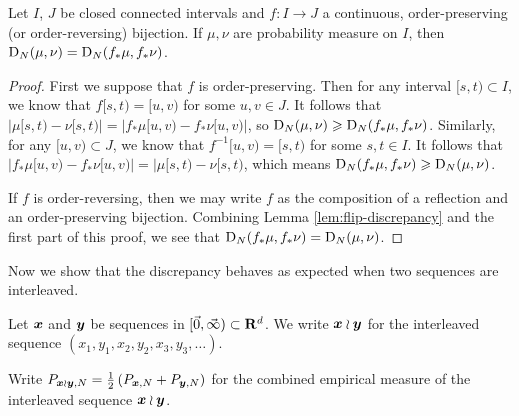 \begin{lemma}\label{lem:push-discrepancy}
Let $I$, $J$ be closed connected intervals and $f\colon I\to J$ a continuous, 
order-preserving (or order-reversing) bijection. If $\mu,\nu$ are probability 
measure on $I$, then 
$\operatorname{D}_N(\mu,\nu) = \operatorname{D}_N(f_\ast \mu,f_\ast\nu)$.
\end{lemma}
\begin{proof}
First we suppose that $f$ is order-preserving. Then for any interval 
$[s,t)\subset I$, we know that $f[s,t) = [u,v)$ for some $u,v\in J$. It follows 
that $|\mu[s,t) - \nu[s,t)| = |f_\ast\mu[u,v) - f_\ast\nu[u,v)|$, so 
$\operatorname{D}_N(\mu,\nu) \geqslant \operatorname{D}_N(f_\ast\mu,f_\ast\nu)$. Similarly, for any 
$[u,v)\subset J$, we know that $f^{-1}[u,v) = [s,t)$ for some 
$s,t\in I$. It follows that 
$|f_\ast\mu[u,v) - f_\ast\nu[u,v)| = |\mu[s,t) - \nu[s,t)$, which means 
$\operatorname{D}_N(f_\ast\mu,f_\ast\nu) \geqslant \operatorname{D}_N(\mu,\nu)$.

If $f$ is order-reversing, then we may write $f$ as the composition of a 
reflection and an order-preserving bijection. Combining Lemma 
\ref{lem:flip-discrepancy} and the first part of this proof, we see that 
$\operatorname{D}_N(f_\ast\mu,f_\ast\nu) = \operatorname{D}_N(\mu,\nu)$. 
\end{proof}

Now we show that the discrepancy behaves as expected when two sequences are 
interleaved. 

\begin{definition}
Let ${\boldsymbol x}$ and ${\boldsymbol y}$ be sequences in $[\vec{0},\vec{\infty})\subset \mathbf{R}^d$. We write 
${\boldsymbol x}\wr{\boldsymbol y}$ for the interleaved sequence $(x_1,y_1,x_2,y_2,x_3,y_3,\dots)$. 
\end{definition}

Write 
$P_{{\boldsymbol x}\wr{\boldsymbol y},N} = \frac{1}{2} \left( P_{{\boldsymbol x},N} + P_{{\boldsymbol y},N}\right)$ for the 
combined empirical measure of the interleaved sequence ${\boldsymbol x}\wr{\boldsymbol y}$. 

